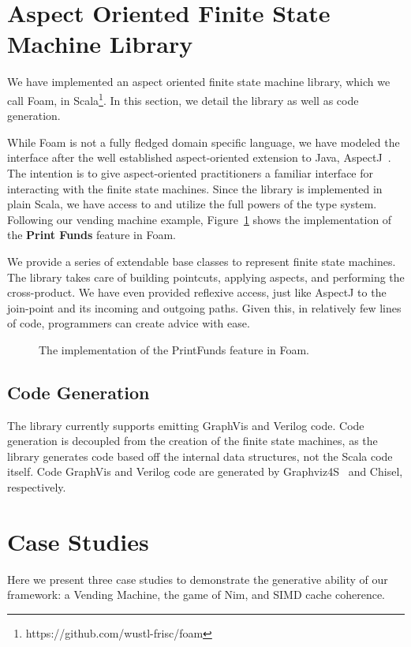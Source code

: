 \documentclass[sigplan,anonymous,review]{acmart}
\begin{document}
\section{Aspect Oriented Finite State Machine Library}\label{sec:foam}
We have implemented an aspect oriented finite state machine library, which we call Foam,  in Scala\footnote{https://github.com/wustl-frisc/foam}. In this section, we detail the library as well as code generation.

While Foam is not a fully fledged domain specific language, we have modeled the interface after the well established aspect-oriented extension to Java, AspectJ~\cite{}. The intention is to give aspect-oriented practitioners a familiar interface for interacting with the finite state machines. Since the library is implemented in plain Scala, we have access to and utilize the full powers of the type system. Following our vending machine example, Figure~\ref{lst:PrintFunds} shows the implementation of the \textbf{Print Funds} feature in Foam.

We provide a series of extendable base classes to represent finite state machines. The library takes care of building pointcuts, applying aspects, and performing the cross-product. We have even provided reflexive access, just like AspectJ to the join-point and its incoming and outgoing paths. Given this, in relatively few lines of code, programmers can create advice with ease.

\begin{figure}
    \centering
    
    \caption{The implementation of the PrintFunds feature in Foam.}
    \label{lst:PrintFunds}
\end{figure}

\subsection{Code Generation}
The library currently supports emitting GraphVis and Verilog code. Code generation is decoupled from the creation of the finite state machines, as the library generates code based off the internal data structures, not the Scala code itself. Code GraphVis and Verilog code are generated by Graphviz4S~\cite{} and Chisel, respectively. 

\section{Case Studies}
Here we present three case studies to demonstrate the generative ability of our framework: a Vending Machine, the game of Nim, and SIMD cache coherence.
\end{document}
